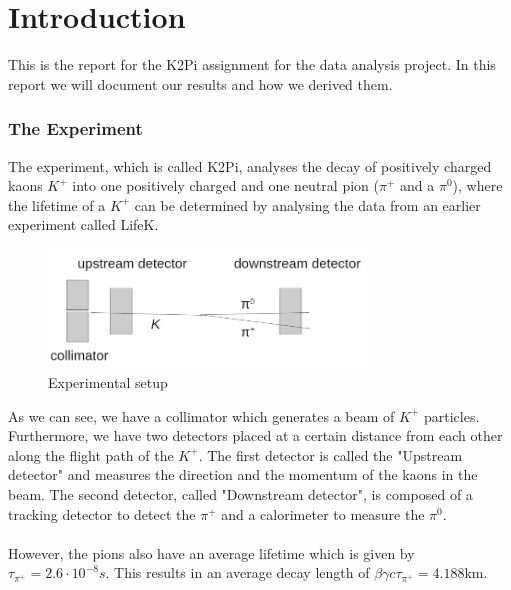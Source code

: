 \documentclass[a4paper,parskip,11pt, DIV12]{scrreprt}
\begin{document}
	\renewcommand{\chaptermark}[1]{ \markboth{#1}{} } %
	
	
	
	\chapter{Introduction}
	
	This is the report for the K2Pi assignment for the data analysis project. In this report we will document our results and how we derived them.
	
	\subsection*{The Experiment}
	
	The experiment, which is called K2Pi, analyses the decay of positively charged kaons $K^+$ into one positively charged and one neutral pion ($\pi^+$ and a $\pi^0$), where the lifetime of a $K^+$ can be determined by analysing the data from an earlier experiment called LifeK.
	
	\begin{figure}[h] 
		\centering
		\includegraphics[width=0.75\textwidth]{ExperimentSetup.jpg} 
		\caption{Experimental setup}
		\label{fig:1}    
	\end{figure}
	
	As we can see, we have a collimator which generates a beam of $K^+$ particles. Furthermore, we have two detectors placed at a certain distance from each other along the flight path of the $K^+$. The first detector is called the "Upstream detector" and measures the direction and the momentum of the kaons in the beam. The second detector, called "Downstream detector", is composed of a tracking detector to detect the $\pi^+$ and a calorimeter to measure the $\pi^0$.
	\\
	\\
	However, the pions also have an average lifetime which is given by $\tau_{\pi^+} = 2.6 \cdot 10^{-8}s$. This results in an average decay length of $\beta \gamma c\tau_{\pi^+} = 4.188$km.
	
\end{document}
